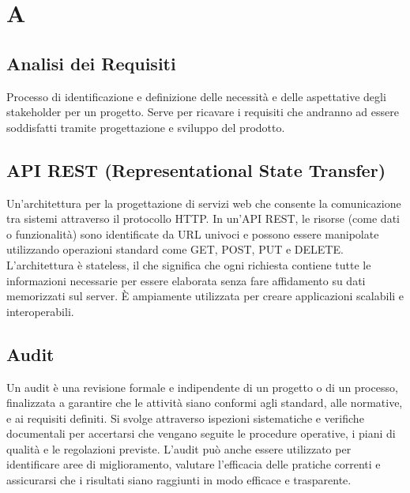 \documentclass{article}
\begin{document}


\section{A}

\subsection{Analisi dei Requisiti}
Processo di identificazione e definizione delle necessità e delle aspettative degli stakeholder per un progetto. Serve per ricavare i requisiti che andranno ad essere soddisfatti tramite progettazione e sviluppo del prodotto.

\subsection{API REST (Representational State Transfer)}
Un'architettura per la progettazione di servizi web che consente la comunicazione tra sistemi attraverso il protocollo HTTP. In un'API REST, le risorse (come dati o funzionalità) sono identificate da URL univoci e possono essere manipolate utilizzando operazioni standard come GET, POST, PUT e DELETE. L'architettura è stateless, il che significa che ogni richiesta contiene tutte le informazioni necessarie per essere elaborata senza fare affidamento su dati memorizzati sul server. È ampiamente utilizzata per creare applicazioni scalabili e interoperabili.

\subsection{Audit}
Un audit è una revisione formale e indipendente di un progetto o di un processo, finalizzata a garantire che le attività siano conformi agli standard, alle normative, e ai requisiti definiti. Si svolge attraverso ispezioni sistematiche e verifiche documentali per accertarsi che vengano seguite le procedure operative, i piani di qualità e le regolazioni previste. L’audit può anche essere utilizzato per identificare aree di miglioramento, valutare l’efficacia delle pratiche correnti e assicurarsi che i risultati siano raggiunti in modo efficace e trasparente.
\end{document}
